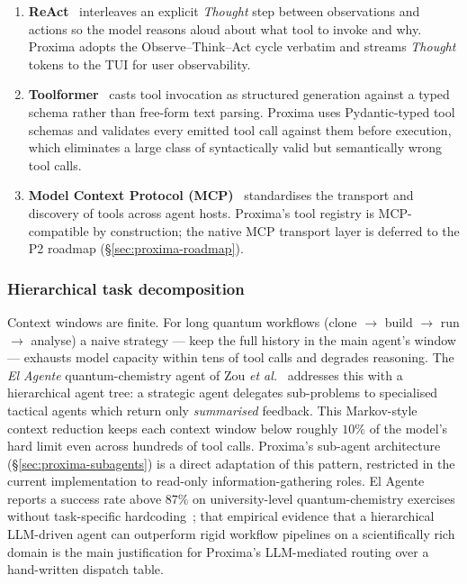 \documentclass[11pt,a4paper]{article}
\begin{document}
\begin{enumerate}[leftmargin=1.5cm]
  \item \textbf{ReAct}~\cite{yao2023react} interleaves an explicit \emph{Thought}
        step between observations and actions so the model reasons aloud about
        what tool to invoke and why. Proxima adopts the Observe--Think--Act cycle
        verbatim and streams \emph{Thought} tokens to the TUI for user
        observability.
  \item \textbf{Toolformer}~\cite{schick2023toolformer} casts tool invocation as
        structured generation against a typed schema rather than free-form text
        parsing. Proxima uses Pydantic-typed tool schemas and validates every
        emitted tool call against them before execution, which eliminates a large
        class of syntactically valid but semantically wrong tool calls.
  \item \textbf{Model Context Protocol (MCP)}~\cite{mcp2024} standardises the
        transport and discovery of tools across agent hosts. Proxima's tool
        registry is MCP-compatible by construction; the native MCP transport
        layer is deferred to the P2 roadmap (\S\ref{sec:proxima-roadmap}).
\end{enumerate}

\subsubsection*{Hierarchical task decomposition}

Context windows are finite. For long quantum workflows (clone $\to$ build $\to$
run $\to$ analyse) a naive strategy --- keep the full history in the main agent's
window --- exhausts model capacity within tens of tool calls and degrades
reasoning. The \emph{El Agente} quantum-chemistry agent of Zou \textit{et
al.}~\cite{zou2025elagente} addresses this with a hierarchical agent tree: a
strategic agent delegates sub-problems to specialised tactical agents which return
only \emph{summarised} feedback. This Markov-style context reduction keeps each
context window below roughly $10\%$ of the model's hard limit even across hundreds
of tool calls. Proxima's sub-agent architecture (\S\ref{sec:proxima-subagents}) is
a direct adaptation of this pattern, restricted in the current implementation to
read-only information-gathering roles. El Agente reports a success rate above
$87\%$ on university-level quantum-chemistry exercises without task-specific
hardcoding~\cite{zou2025elagente}; that empirical evidence that a hierarchical
LLM-driven agent can outperform rigid workflow pipelines on a scientifically rich
domain is the main justification for Proxima's LLM-mediated routing over a
hand-written dispatch table.
\end{document}
